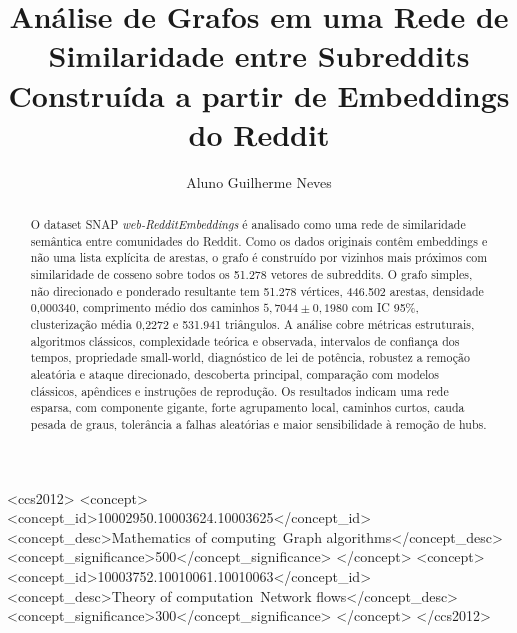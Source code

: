 \documentclass[sigconf]{webmedia}
\begin{document}
\title[Análise de Grafos em Embeddings do Reddit]{Análise de Grafos em uma Rede de Similaridade entre Subreddits Construída a partir de Embeddings do Reddit}

\author{Aluno Guilherme Neves}
\renewcommand{\shortauthors}{Aluno Guilherme Neves}

\begin{abstract}
O dataset SNAP \textit{web-RedditEmbeddings} é analisado como uma rede de
similaridade semântica entre comunidades do Reddit. Como os dados
originais contêm embeddings e não uma lista explícita de arestas, o
grafo é construído por vizinhos mais próximos com similaridade de
cosseno sobre todos os 51.278 vetores de subreddits. O grafo simples,
não direcionado e ponderado resultante tem 51.278 vértices, 446.502 arestas,
densidade 0,000340, comprimento médio dos caminhos
$5,7044 \pm 0,1980$ com IC 95\%, clusterização média 0,2272 e 531.941
triângulos. A análise cobre métricas estruturais, algoritmos clássicos,
complexidade teórica e observada, intervalos de confiança dos tempos,
propriedade small-world, diagnóstico de lei de potência, robustez a
remoção aleatória e ataque direcionado, descoberta principal, comparação
com modelos clássicos, apêndices e instruções de reprodução. Os
resultados indicam uma rede esparsa, com componente gigante, forte
agrupamento local, caminhos curtos, cauda pesada de graus, tolerância a
falhas aleatórias e maior sensibilidade à remoção de hubs.
\end{abstract}

\begin{CCSXML}
<ccs2012>
   <concept>
       <concept_id>10002950.10003624.10003625</concept_id>
       <concept_desc>Mathematics of computing~Graph algorithms</concept_desc>
       <concept_significance>500</concept_significance>
   </concept>
   <concept>
       <concept_id>10003752.10010061.10010063</concept_id>
       <concept_desc>Theory of computation~Network flows</concept_desc>
       <concept_significance>300</concept_significance>
   </concept>
</ccs2012>
\end{CCSXML}



\maketitle
\end{document}
